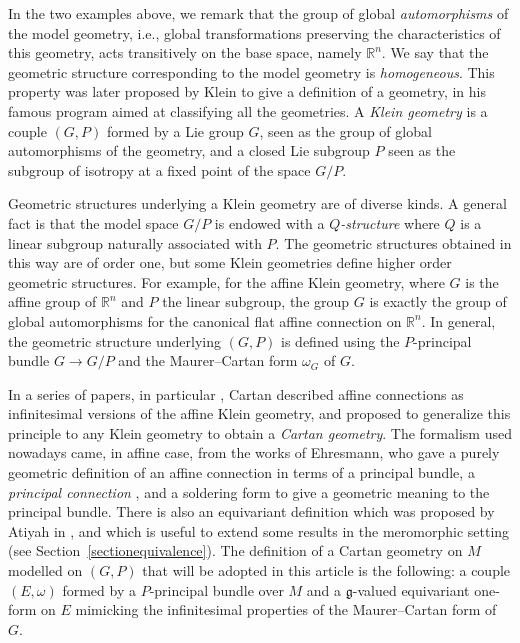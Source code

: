 \documentclass[pdftex]{sigma}
\numberwithin{equation}{section}
\begin{document}
In the two examples above, we remark that the group of global \textit{automorphisms} of the model geometry, i.e., global transformations preserving the characteristics of this geometry, acts transitively on the base space, namely $\mathbb{R}^n$. We say that the geometric structure corresponding to the model geometry is \textit{homogeneous}. This property was later proposed by Klein to give 	a definition of a geometry, in his famous program aimed at classifying all the geometries. A \textit{Klein geometry} is a couple $(G,P)$ formed by a Lie group $G$, seen as the group of global automorphisms of the geometry, and a closed Lie subgroup $P$ seen as the subgroup of isotropy at a fixed point of the space $G/P$.

Geometric structures underlying a Klein geometry are of diverse kinds. A general fact is that the model space $G/P$ is endowed with a \textit{$Q$-structure} where $Q$ is a linear subgroup naturally associated with $P$. The geometric structures obtained in this way are of order one, but some Klein geometries define higher order geometric structures. For example, for the affine Klein geometry, where $G$ is the affine group of $\mathbb{R}^n$ and $P$ the linear subgroup, the group $G$ is exactly the group of global automorphisms for the canonical flat affine connection on $\mathbb{R}^n$. In general, the geometric structure underlying $(G,P)$ is defined using the $P$-principal bundle $G\longrightarrow G/P$ and the Maurer--Cartan form $\omega_G$ of $G$.

In a series of papers, in particular \cite{Cartan2}, Cartan described affine connections as infinitesimal versions of the affine Klein geometry, and proposed to generalize this principle to any Klein geometry to obtain a \textit{Cartan geometry}. The formalism used nowadays came, in affine case, from the works of Ehresmann, who gave a purely geometric definition of an affine connection in terms of a principal bundle, a \textit{principal connection} \cite[p.~154]{Erhesmanh}, and a soldering form to give a geometric meaning to the principal bundle. There is also an equivariant definition which was proposed by Atiyah in \cite[p.~188]{Atiyah}, and which is useful to extend some results in the meromorphic setting (see Section~\ref{sectionequivalence}). The definition of a Cartan geometry on $M$ modelled on $(G,P)$ that will be adopted in this article is the following: a couple $(E,\omega)$ formed by a $P$-principal bundle over $M$ and a $\mathfrak{g}$-valued equivariant one-form on $E$ mimicking the infinitesimal properties of the Maurer--Cartan form of $G$.
\end{document}
